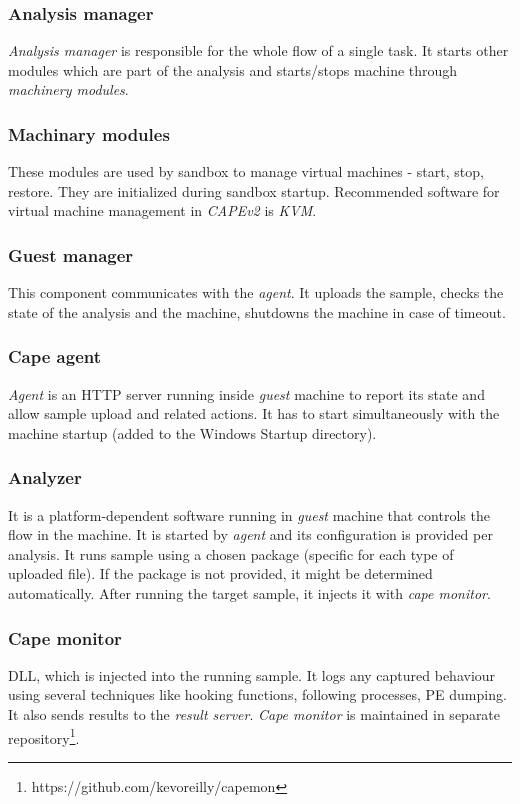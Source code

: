 \subsubsection*{Analysis manager}
\emph{Analysis manager} is responsible for the whole flow of a single task. It starts other modules which are part of the analysis and starts/stops machine through \emph{machinery modules}.

\subsubsection*{Machinary modules}
These modules are used by sandbox to manage virtual machines - start, stop, restore. They are initialized during sandbox startup. Recommended  software for virtual machine management in \emph{CAPEv2} is \emph{KVM}.

\subsubsection*{Guest manager}
This component communicates with the \emph{agent}. It uploads the sample, checks the state of the analysis and the machine, shutdowns the machine in case of timeout.

\subsubsection*{Cape agent}
\emph{Agent} is an HTTP server running inside \emph{guest} machine to report its state and allow sample upload and related actions. It has to start simultaneously with the machine startup (added to the Windows Startup directory).

\subsubsection*{Analyzer}
It is a platform-dependent software running in \emph{guest} machine that controls the flow in the machine. It is started by \emph{agent} and its configuration is provided per analysis. It runs sample using a chosen package (specific for each type of uploaded file). If the package is not provided, it might be determined automatically. After running the target sample, it injects it with \emph{cape monitor}.

\subsubsection*{Cape monitor}
DLL, which is injected into the running sample. It logs any captured behaviour using several techniques like hooking functions, following processes, PE dumping. It also sends results to the \emph{result server}. \emph{Cape monitor} is maintained in separate repository\footnote{https://github.com/kevoreilly/capemon}.

